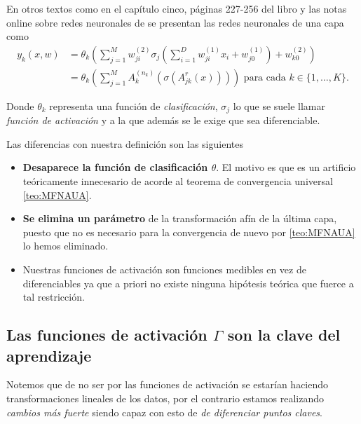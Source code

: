 En otros textos como en el capítulo cinco, páginas 227-256 del libro \cite{BishopPaterRecognition} y las notas online sobre redes neuronales de \cite{MostafaLearningFromData} se presentan las redes neuronales de una capa como 
\begin{align}
    y_k(x,w) &= \theta_k 
    \left( 
        \sum^M_{j=1} w_{ji}^{(2)}
        \sigma_j 
        \left(
            \sum_{i=1}^D w_{ji}^{(1)} x_i + w_{j0}^{(1)}
        \right)
        + w_{k0}^{(2)}
    \right) 
    \\
    & = 
    \theta_k 
    \left( 
        \sum^M_{j=1} A^{(n_k)}_{k}
        \left(
            \sigma 
            \left(
                A^{r}_{j k}
                \left(
                    x
                \right)
            \right)
        \right)
    \right)
    \text{ para cada  } k \in \{1, \ldots, K \}.
\end{align}

Donde $\theta_k$ representa una función de \textit{clasificación}, 
$\sigma_j$ lo que se suele llamar \textit{función de activación} y a la que además se le exige que sea diferenciable.

Las diferencias con nuestra definición son las siguientes 
\begin{itemize}
    \item \textbf{Desaparece la función de clasificación $\theta$}. El motivo es que es un artificio teóricamente innecesario de acorde al teorema de convergencia universal \ref{teo:MFNAUA}.
    \item \textbf{Se elimina un parámetro} de la transformación afín de la última capa, puesto que no es necesario para la convergencia de nuevo por \ref{teo:MFNAUA} lo hemos eliminado.
    \item Nuestras funciones de activación son funciones medibles en vez de diferenciables ya que a priori no existe ninguna hipótesis teórica que fuerce a tal restricción.
\end{itemize}

\subsection*{Las funciones de activación $\Gamma$ son la clave del aprendizaje}  

Notemos que de no ser por las funciones de activación se estarían haciendo transformaciones lineales de los datos, por el contrario estamos realizando \textit{cambios más fuerte} siendo capaz con esto de \textit{de diferenciar puntos claves}.

